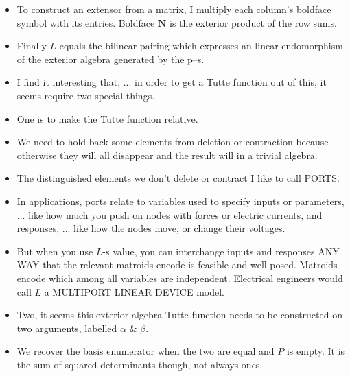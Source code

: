 \documentclass[14pt]{extarticle}
\begin{document}
{\begin{itemize}
\item
To construct an extensor from a matrix, I multiply each column's boldface symbol with its entries.
Boldface $\mathbf{N}$ is the exterior product of the row sums.

\item
  Finally $L$ equals the bilinear pairing which expresses an linear endomorphism
  of the exterior algebra generated by the p--s.

\item
  I find it interesting that, ... in order to get a Tutte function out
  of this, it seems require two special things.

\item
One is to make the Tutte function relative.

\item
  We need to hold back some elements from deletion or contraction because
  otherwise they will all disappear and the result will in a trivial algebra.

\item
  The distinguished elements we don't delete or contract I like to call PORTS.


\item In applications, ports relate to variables used to specify inputs
  or parameters, ... like how much you push on nodes with forces or electric currents,
  and responses, ... like how the nodes move, or change their voltages.

\item But when you use $L$-s value, you can interchange inputs and responses ANY WAY that the
  relevant matroids encode is feasible and well-posed.  Matroids encode which among all
  variables are independent.  Electrical engineers would
  call $L$ a MULTIPORT LINEAR DEVICE model.


\item
  Two, it seems this exterior algebra Tutte function needs to be constructed on 
  two arguments, labelled $\alpha$ \& $\beta$.

\item
  We recover the basis enumerator when the two are equal and $P$ is empty.  It
  is the sum of squared determinants though, not always ones.


\end{itemize}}
\end{document}
